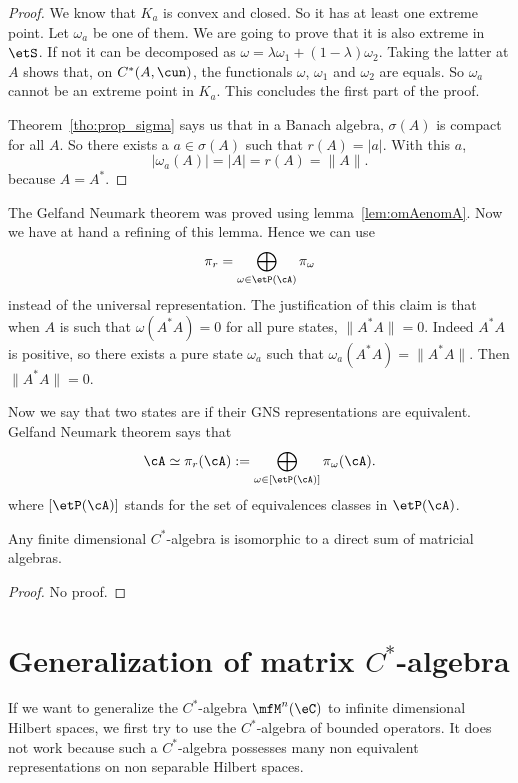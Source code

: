 \begin{proof}
We know that $K_a$ is convex and closed. So it has at least one extreme point. Let $\omega_a$ be one of them. We are going to prove that it is also extreme in $\etS$. If not it can be decomposed as $\omega=\lambda\omega_1+(1-\lambda)\omega_2$. Taking the latter at $A$ shows that, on $C^*(A,\cun)$, the functionals $\omega$, $\omega_1$ and $\omega_2$ are equals. So $\omega_a$ cannot be an extreme point in $K_a$. This concludes the first part of the proof.


Theorem~\ref{tho:prop_sigma} says us that in a Banach algebra, $\sigma(A)$ is compact for all $A$. So there exists a $a\in\sigma(A)$ such that $r(A)=| a |$. With this $a$,
 \[
  | \omega_a(A) |=| A |=r(A)=\| A \|.
\]
because $A=A^*$.

\end{proof}

The Gelfand Neumark theorem was proved using lemma~\ref{lem:omAenomA}. Now we have at hand a refining of this lemma. Hence we can use
\[
  \pi_r=\bigoplus_{\omega\in\etP(\cA)}\pi_{\omega}
\]
instead of the universal representation. The justification of this claim is that when $A$ is such that $\omega(A^*A)=0$ for all pure states, $\| A^*A \|=0$. Indeed $A^*A$ is positive, so there exists a pure state $\omega_a$ such that $\omega_a(A^*A)=\| A^*A \|$. Then $\| A^*A \|=0$.

Now we say that two states are  if their GNS representations are equivalent. Gelfand Neumark theorem  says that
\[
  \cA\simeq\pi_r(\cA):=\bigoplus_{\omega\in[\etP(\cA)]}\pi_{\omega}(\cA).
\]
where $[\etP(\cA)]$ stands for the set of equivalences classes in $\etP(\cA)$.

\begin{proposition}
Any finite dimensional $C^*$-algebra is isomorphic to a direct sum of matricial algebras.
\end{proposition}
\begin{proof}
    No proof.
\end{proof}

\section{Generalization of matrix \texorpdfstring{$C^*$}{C}-algebra}

If we want to generalize the $C^*$-algebra $\mfM^n(\eC)$ to infinite dimensional Hilbert spaces, we first try to use the $C^*$-algebra of bounded operators. It does not work because such a $C^*$-algebra possesses many non equivalent representations on non separable Hilbert spaces.

